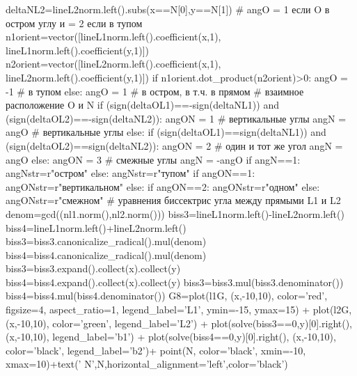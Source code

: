 \documentclass[a4paper, 12pt]{article}
\begin{document}
\begin{sagesilent}
deltaNL2=lineL2norm.left().subs(x==N[0],y==N[1])
# angO = 1 если O в остром углу и = 2 если в тупом
n1orient=vector([lineL1norm.left().coefficient(x,1), lineL1norm.left().coefficient(y,1)])
n2orient=vector([lineL2norm.left().coefficient(x,1), lineL2norm.left().coefficient(y,1)])
if n1orient.dot_product(n2orient)>0:
   angO = -1 # в тупом
else:
   angO = 1 # в остром, в т.ч. в прямом
# взаимное расположение O и N
if (sign(deltaOL1)==-sign(deltaNL1)) and (sign(deltaOL2)==-sign(deltaNL2)):
   angON = 1 # вертикальные углы
   angN = angO # вертикальные углы
else:
   if (sign(deltaOL1)==sign(deltaNL1)) and (sign(deltaOL2)==sign(deltaNL2)):
      angON = 2 # один и тот же угол
      angN = angO
   else:
      angON = 3 # смежные углы
      angN = -angO
if angN==1:
   angNstr=r"остром"
else:
   angNstr=r"тупом"
if angON==1:
   angONstr=r"вертикальном"
else:
   if angON==2:
      angONstr=r"одном"
   else:
      angONstr=r"смежном"
# уравнения биссектрис угла между прямыми L1 и L2
denom=gcd((nl1.norm(),nl2.norm()))
biss3=lineL1norm.left()-lineL2norm.left()
biss4=lineL1norm.left()+lineL2norm.left()
biss3=biss3.canonicalize_radical().mul(denom)
biss4=biss4.canonicalize_radical().mul(denom)
biss3=biss3.expand().collect(x).collect(y)
biss4=biss4.expand().collect(x).collect(y)
biss3=biss3.mul(biss3.denominator())
biss4=biss4.mul(biss4.denominator())
G8=plot(l1G, (x,-10,10), color='red', figsize=4, aspect_ratio=1, legend_label='L1', ymin=-15, ymax=15) + plot(l2G, (x,-10,10), color='green', legend_label='L2') + plot(solve(biss3==0,y)[0].right(), (x,-10,10), legend_label='b1') + plot(solve(biss4==0,y)[0].right(), (x,-10,10), color='black', legend_label='b2')+ point(N, color='black', xmin=-10, xmax=10)+text('  N',N,horizontal_alignment='left',color='black')
\end{sagesilent}
\end{document}
